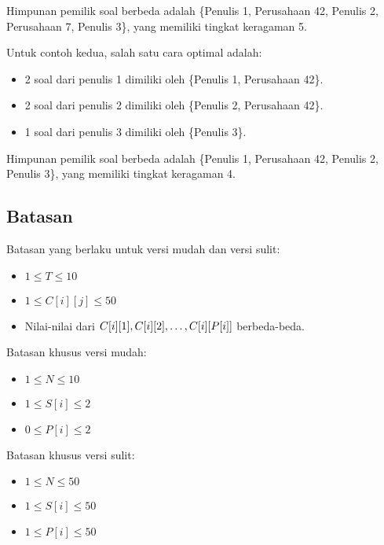 \documentclass[../main_problemset.tex]{subfiles} %
\begin{document}
Himpunan pemilik soal berbeda adalah \{Penulis 1, Perusahaan 42, Penulis 2, Perusahaan 7, Penulis 3\}, yang memiliki tingkat keragaman 5.

Untuk contoh kedua, salah satu cara optimal adalah:

\begin{itemize}
	\item 2 soal dari penulis 1 dimiliki oleh \{Penulis 1, Perusahaan 42\}.
	\item 2 soal dari penulis 2 dimiliki oleh \{Penulis 2, Perusahaan 42\}.
	\item 1 soal dari penulis 3 dimiliki oleh \{Penulis 3\}.
\end{itemize}

Himpunan pemilik soal berbeda adalah \{Penulis 1, Perusahaan 42, Penulis 2, Penulis 3\}, yang memiliki tingkat keragaman 4.

\subsection*{Batasan}

Batasan yang berlaku untuk versi mudah dan versi sulit:

\begin{itemize}
	\item $ 1 \le T \le 10 $
	\item $ 1 \le C[i][j] \le 50 $
	\item Nilai-nilai dari $ C[i][1], C[i][2], \mathellipsis, C[i][P[i]] $ berbeda-beda.
\end{itemize}

Batasan khusus versi mudah:

\begin{itemize}
	\item $1 \le N \le 10$
	\item $1 \le S[i] \le 2$
	\item $0 \le P[i] \le 2$
\end{itemize}

Batasan khusus versi sulit:

\begin{itemize}
	\item $1 \le N \le 50$
	\item $1 \le S[i] \le 50$
	\item $1 \le P[i] \le 50$
\end{itemize}
\end{document}
